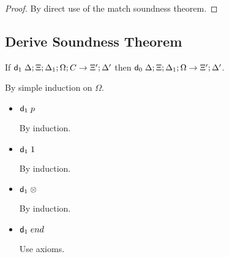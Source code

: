 \begin{proof}
By direct use of the match soundness theorem.
\end{proof}

\subsection{Derive Soundness Theorem}

If $\mathsf{d}_1 \; \Delta; \Xi; \Delta_1; \Omega; C \rightarrow \Xi'; \Delta'$ then $\mathsf{d}_0 \; \Delta; \Xi; \Delta_1; \Omega \rightarrow \Xi'; \Delta'$.

By simple induction on $\Omega$.

\begin{itemize}
   \item $\mathsf{d}_1 \; p$
   
   By induction.
   
   \item $\mathsf{d}_1 \; 1$
   
   By induction.
   
   \item $\mathsf{d}_1 \; \otimes$
   
   By induction.
   
   \item $\mathsf{d}_1 \; end$
   
   Use axioms.
   
\end{itemize}